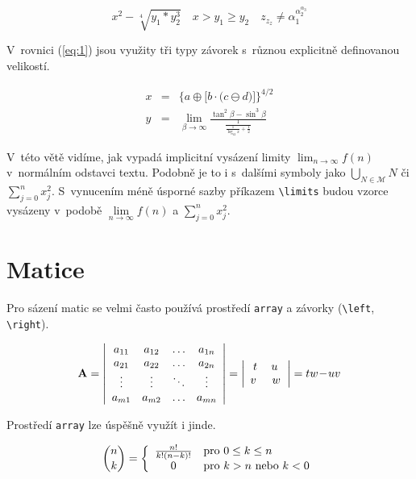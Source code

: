 \documentclass[11pt, twocolumn]{article}
\begin{document}
\[
x^2 - \sqrt[4]{y_1 * y_2^3}\quad x>y_1\geq y_2\quad z_{z_z}\neq \alpha_1^{\alpha_2^{\alpha_3}}
\]

V~rovnici (\ref{eq:1}) jsou využity tři typy závorek s~různou explicitně definovanou velikostí.

\begin{eqnarray}
    \label{eq:1}
    x & = & \bigg\{ a \oplus \Big[ b \cdot \big( c \ominus d \big) \Big] \bigg\}^{4/2} \\ 
    \label{eq:2}
    y & = & \lim_{\beta\to\infty}\frac{\tan^2\beta-\sin^3\beta}{\frac{1}{\frac{1}{\log_{42}x}+\frac{1}{2}}}
\end{eqnarray}

V~této větě vidíme, jak vypadá implicitní vysázení limity $\lim_{n\to\infty}f(n)$ v~normálním odstavci textu. Podobně je to i s~dalšími symboly jako $\bigcup_{N\in \mathcal{M}}N$ či $\sum_{j=0}^{n}x_j^2 $.
S~vynucením méně úsporné sazby příkazem \verb|\limits| budou vzorce vysázeny v~podobě $\lim\limits_{n\to\infty}f(n)$ a $\sum\limits_{j=0}^{n}x_j^2$.


\section{Matice}

Pro sázení matic se velmi často používá prostředí \verb|array| a závorky (\verb|\left|, \verb|\right|). 

\[
\text{\textbf{A}} =
\left|
\begin{array}{cccc}
    a_{11} & a_{12} & \ldots & a_{1n} \\
    a_{21} & a_{22} & \ldots & a_{2n} \\
    \vdots & \vdots & \ddots & \vdots \\
    a_{m1} & a_{m2} & \ldots & a_{mn}
\end{array}
\right|
=
\left|
\begin{array}{cc}
    t & u~\\
    v~& w
\end{array}
\right|
= tw\!-\!uv
\]

Prostředí \verb|array| lze úspěšně využít i jinde.

\[ 
\binom{n}{k} = \left\{
\begin{array}{c l}
\frac{n!}{k!(n-k)!} & \text{pro } 0 \leq k\leq n  \\
0 & \text{pro } k>n \text{ nebo } k<0
\end{array} \right.
\]
\end{document}
